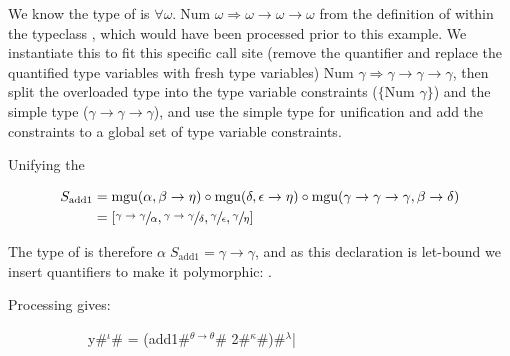 \documentclass[dissertation.tex]{subfiles}
\begin{document}
{{{            We know the type of \haskell{+} is \(\forall\omega.\;\text{Num }\omega \Rightarrow
            \omega\rightarrow\omega\rightarrow\omega\) from the definition of \haskell{+} within the typeclass
            , which would have been processed prior to this example. We instantiate this to fit this
            specific call site (remove the quantifier and replace the quantified type variables with fresh type
            variables) \(\text{Num }\gamma \Rightarrow \gamma\rightarrow\gamma\rightarrow\gamma\), then split the
            overloaded type into the type variable constraints (\(\{\text{Num }\gamma\}\)) and the simple type
            (\(\gamma\rightarrow\gamma\rightarrow\gamma\)), and use the simple type for unification and add the
            constraints to a global set of type variable constraints.

            Unifying the 

            \begin{figure}
                \centering
                \begin{equation*}
                \begin{split}
                    S_\text{add1} & = \text{mgu}(\alpha, \beta \rightarrow \eta) \circ \text{mgu}(\delta, \epsilon \rightarrow \eta) \circ \text{mgu}(\gamma\rightarrow\gamma\rightarrow\gamma, \beta \rightarrow \delta) \\
                                  & = [\sfrac{\gamma\rightarrow\gamma}{\alpha}, \sfrac{\gamma\rightarrow\gamma}{\delta}, \sfrac{\gamma}{\epsilon}, \sfrac{\gamma}{\eta}]
                \end{split}
                \end{equation*}
            \end{figure}

            The type of  is therefore \(\alpha \; S_\text{add1} = \gamma\rightarrow\gamma\), and as this
            declaration is let-bound we insert quantifiers to make it polymorphic: .

            Processing  gives:

            \begin{figure}[H]
            \begin{subfigure}[c]{\textwidth}
                \centering
                \begin{haskellfigure}
                y#\(^\iota\)# = (add1#\(^{\theta\rightarrow\theta}\)# 2#\(^\kappa\)#)#\(^\lambda\)|
                \end{haskellfigure}
            \end{subfigure}


\end{figure}}}}
\end{document}

